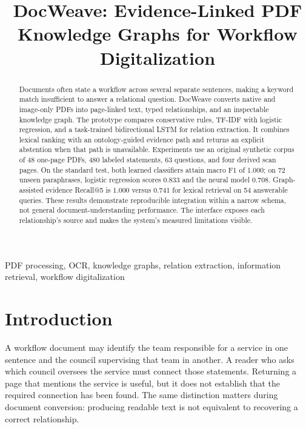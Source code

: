 \documentclass[conference]{IEEEtran}
\begin{document}
\title{DocWeave: Evidence-Linked PDF Knowledge Graphs for Workflow Digitalization}
\author{\IEEEauthorblockN{\AuthorNames}}
\maketitle
\begin{abstract}
Documents often state a workflow across several separate sentences, making a keyword match insufficient to answer a relational question. DocWeave converts native and image-only PDFs into page-linked text, typed relationships, and an inspectable knowledge graph. The prototype compares conservative rules, TF-IDF with logistic regression, and a task-trained bidirectional LSTM for relation extraction. It combines lexical ranking with an ontology-guided evidence path and returns an explicit abstention when that path is unavailable. Experiments use an original synthetic corpus of 48 one-page PDFs, 480 labeled statements, 63 questions, and four derived scan pages. On the standard test, both learned classifiers attain macro F1 of 1.000; on 72 unseen paraphrases, logistic regression scores 0.833 and the neural model 0.708. Graph-assisted evidence Recall@5 is 1.000 versus 0.741 for lexical retrieval on 54 answerable queries. These results demonstrate reproducible integration within a narrow schema, not general document-understanding performance. The interface exposes each relationship's source and makes the system's measured limitations visible.
\end{abstract}
\begin{IEEEkeywords}
PDF processing, OCR, knowledge graphs, relation extraction, information retrieval, workflow digitalization
\end{IEEEkeywords}
\MetadataNotice

\section{Introduction}
A workflow document may identify the team responsible for a service in one sentence and the council supervising that team in another. A reader who asks which council oversees the service must connect those statements. Returning a page that mentions the service is useful, but it does not establish that the required connection has been found. The same distinction matters during document conversion: producing readable text is not equivalent to recovering a correct relationship.
\end{document}
